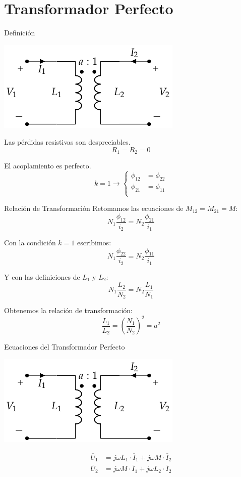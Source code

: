 \documentclass[xcolor={usenames,svgnames,dvipsnames}]{beamer}
\begin{document}
\section{Transformador Perfecto}
\label{sec:org95a9495}
\begin{frame}[label={sec:orgf6bc4e0}]{Definición}
\begin{center}
\includegraphics[height=0.35\textheight]{../figs/Trafo_Perfecto.pdf}
\end{center}

Las pérdidas resistivas son despreciables.
\[
  R_1 = R_2 = 0
\]

El acoplamiento es perfecto.
\[
  k = 1
\rightarrow 
\left\{
\begin{array}{cc}
  \phi_{12} &= \phi_{22}\\
  \phi_{21} &= \phi_{11}\\
\end{array} \right.
\]
\end{frame}
\begin{frame}[label={sec:orge68ed92}]{Relación de Transformación}
Retomamos las ecuaciones de \(M_{12} = M_{21} = M\):
\[
  N_1 \frac{\phi_{12}}{i_2} = N_2 \frac{\phi_{21}}{i_1}
\]

Con la condición \(k=1\) escribimos:
\[  
  N_1 \frac{\phi_{22}}{i_2} = N_2 \frac{\phi_{11}}{i_1}
\]

Y con las definiciones de \(L_1\) y \(L_2\):
\[
  N_1 \frac{L_2}{N_2} = N_2 \frac{L_1}{N_1}
\]

Obtenemos la relación de transformación:
\[
  \boxed{\frac{L_1}{L_2} = \left(\frac{N_1}{N_2}\right)^2 = a^2}
\]
\end{frame}
\begin{frame}[label={sec:orgc9329b0}]{Ecuaciones del Transformador Perfecto}
\begin{center}
\includegraphics[height=0.45\textheight]{../figs/Trafo_Perfecto.pdf}
\end{center}

\begin{align*}
  \overline{U}_1 &= j \omega L_1 \cdot \overline{I}_1 + j \omega M \cdot \overline{I}_2\\
  \overline{U}_2 &= j \omega M \cdot \overline{I}_1 + j \omega L_2 \cdot \overline{I}_2
\end{align*}
\end{frame}
\end{document}
